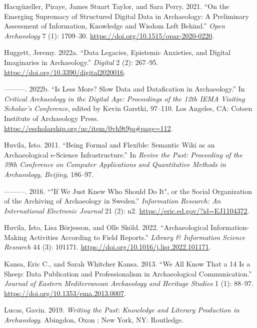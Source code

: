 \documentclass[
]{article}
\newlength{\cslhangindent}
\newenvironment{CSLReferences}[2] %
 {\begin{list}{}{%
  \setlength{\itemindent}{0pt}
  \setlength{\leftmargin}{0pt}
  \setlength{\parsep}{0pt}
  \ifodd #1
   \setlength{\leftmargin}{\cslhangindent}
   \setlength{\itemindent}{-1\cslhangindent}
  \fi
  \setlength{\itemsep}{#2\baselineskip}}}
 {\end{list}}
\begin{document}
\begin{CSLReferences}{1}{0}
Hacıgüzeller, Piraye, James Stuart Taylor, and Sara Perry. 2021. {``On
the {Emerging Supremacy} of {Structured Digital Data} in {Archaeology}:
{A Preliminary Assessment} of {Information}, {Knowledge} and {Wisdom
Left Behind}.''} \emph{Open Archaeology} 7 (1): 1709--30.
\url{https://doi.org/10.1515/opar-2020-0220}.

Huggett, Jeremy. 2022a. {``Data {Legacies}, {Epistemic Anxieties}, and
{Digital Imaginaries} in {Archaeology}.''} \emph{Digital} 2 (2):
267--95. \url{https://doi.org/10.3390/digital2020016}.

---------. 2022b. {``Is {Less More}? {Slow Data} and {Datafication} in
{Archaeology}.''} In \emph{Critical {Archaeology} in the {Digital Age}:
{Proceedings} of the 12th {IEMA Visiting Scholar}'s {Conference}},
edited by Kevin Garstki, 97--110. Los Angeles, CA: Cotsen Institute of
Archaeology Press.
\url{https://escholarship.org/uc/item/0vh9t9jq\#page=112}.

Huvila, Isto. 2011. {``Being Formal and Flexible: Semantic Wiki as an
Archaeological e-Science Infrastructure.''} In \emph{Revive the {Past}:
{Proceeding} of the 39th {Conference} on {Computer Applications} and
{Quantitative Methods} in {Archaeology}, {Beijing}}, 186--97.

---------. 2016. {``"{If We Just Knew Who Should Do It}", or the {Social
Organization} of the {Archiving} of {Archaeology} in {Sweden}.''}
\emph{Information Research: An International Electronic Journal} 21 (2):
n2. \url{https://eric.ed.gov/?id=EJ1104372}.

Huvila, Isto, Lisa Börjesson, and Olle Sköld. 2022. {``Archaeological
Information-Making Activities According to Field Reports.''}
\emph{Library \& Information Science Research} 44 (3): 101171.
\url{https://doi.org/10.1016/j.lisr.2022.101171}.

Kansa, Eric C., and Sarah Whitcher Kansa. 2013. {``We {All Know That} a
14 {Is} a {Sheep}: {Data Publication} and {Professionalism} in
{Archaeological Communication}.''} \emph{Journal of Eastern
Mediterranean Archaeology and Heritage Studies} 1 (1): 88--97.
\url{https://doi.org/10.1353/ema.2013.0007}.

Lucas, Gavin. 2019. \emph{Writing the Past: {Knowledge} and Literary
Production in Archaeology}. Abingdon, Oxon ; New York, NY: Routledge.


\end{CSLReferences}
\end{document}

